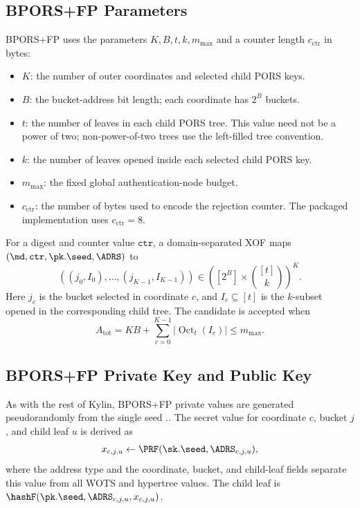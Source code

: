 \subsection{BPORS+FP Parameters}
\label{sec:bporspara}

BPORS+FP uses the parameters $K,B,t,k,m_{\max}$ and a counter length
$c_{\mathrm{ctr}}$ in bytes:
\begin{itemize}
    \item $K$: the number of outer coordinates and selected child PORS keys.
    \item $B$: the bucket-address bit length; each coordinate has $2^B$ buckets.
    \item $t$: the number of leaves in each child PORS tree.  This value need
    not be a power of two; non-power-of-two trees use the left-filled tree
    convention.
    \item $k$: the number of leaves opened inside each selected child PORS key.
    \item $m_{\max}$: the fixed global authentication-node budget.
    \item $c_{\mathrm{ctr}}$: the number of bytes used to encode the rejection
    counter.  The packaged implementation uses $c_{\mathrm{ctr}}=8$.
\end{itemize}

For a digest \md and counter value $\mathtt{ctr}$, a domain-separated XOF maps
$(\md,\mathtt{ctr},\pk.\seed,\ADRS)$ to
\[
    ((j_0,I_0),\ldots,(j_{K-1},I_{K-1}))
    \in \left([2^B]\times\binom{[t]}{k}\right)^K .
\]
Here $j_c$ is the bucket selected in coordinate $c$, and
$I_c\subseteq[t]$ is the $k$-subset opened in the corresponding child tree.
The candidate is accepted when
\[
    A_{\mathrm{tot}}
    =KB+\sum_{c=0}^{K-1}\left|\operatorname{Oct}_t(I_c)\right|
    \le m_{\max}.
\]

\subsection{BPORS+FP Private Key and Public Key}

As with the rest of Kylin, BPORS+FP private values are generated
pseudorandomly from the single seed \sk.\seed.  The secret value for
coordinate $c$, bucket $j$, and child leaf $u$ is derived as
\[
    x_{c,j,u}\gets \PRF(\sk.\seed,\ADRS_{c,j,u}),
\]
where the address type and the coordinate, bucket, and child-leaf fields
separate this value from all WOTS and hypertree values.  The child leaf is
$\hashF(\pk.\seed,\ADRS_{c,j,u},x_{c,j,u})$.

